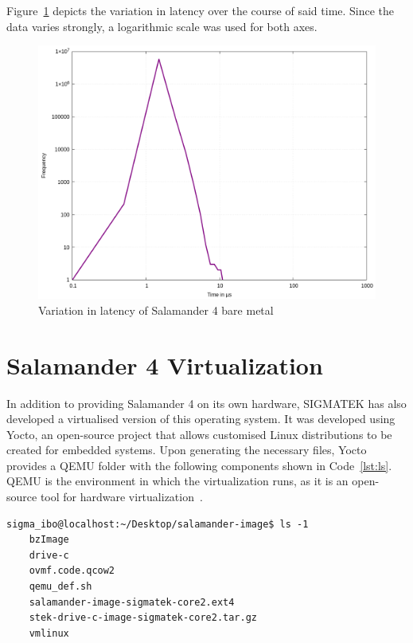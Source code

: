 \documentclass[MMR,Master,english]{twbook}
\begin{document}
\noindent Figure~\ref{fig:gnuplot_max_latency_hardware} depicts the variation in latency over the course of said time. Since the data varies strongly, a logarithmic scale was used for both axes.

\begin{figure}[H]
	\centering
	\includegraphics[width=0.7\columnwidth]{masterthesis-documentation/docs/sigmatek/xenomai/0hardware/gnuplot_max_latency_hardware.png}
	\caption[Variation in latency of Salamander 4 bare metal]{Variation in latency of Salamander 4 bare metal}
	\label{fig:gnuplot_max_latency_hardware}
\end{figure}


\section{Salamander 4 Virtualization}\label{sec:salamander4-virtualization}
In addition to providing Salamander 4 on its own hardware, SIGMATEK has also developed a virtualised version of this operating system. It was developed using Yocto, an open-source project that allows customised Linux distributions to be created for embedded systems. Upon generating the necessary files, Yocto provides a QEMU folder with the following components shown in Code~\ref{lst:ls}. QEMU is the environment in which the virtualization runs, as it is an open-source tool for hardware virtualization~\cite{QEMU}.

\vspace{1em}
\begin{minipage}{\linewidth}
	\begin{lstlisting}[name={Contents of QEMU folder for Salamander 4},label={lst:ls}]
    sigma_ibo@localhost:~/Desktop/salamander-image$ ls -1
    bzImage
    drive-c
    ovmf.code.qcow2
    qemu_def.sh
    salamander-image-sigmatek-core2.ext4
    stek-drive-c-image-sigmatek-core2.tar.gz
    vmlinux
    \end{lstlisting}
\end{minipage}
\end{document}
